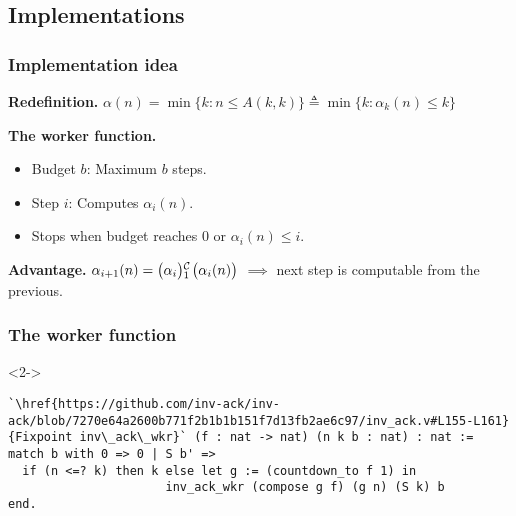 \subsection{Implementations}
\begin{frame}
\frametitle{Implementation idea}
\textbf{Redefinition.}
$
\alpha(n) = \min\{k: n\le A(k, k) \} \triangleq \min\{k: \alpha_k(n)\le k \}
$

\bigskip

\textbf{The worker function.}
\bigskip
\begin{itemize}
	\item Budget $b$: Maximum $b$ steps.
	\item Step $i$: Computes $\alpha_i(n)$.
	\item Stops when budget reaches $0$ or $\alpha_i(n) \le i$.
\end{itemize}

\bigskip

\textbf{Advantage.} $\alpha_{i+1}(n) = \cdt{\big(\alpha_i\big)}{1}\big(\alpha_i(n)\big)$ $\implies$ next step is computable from the previous.
\end{frame}


\begin{frame}[fragile]
\frametitle{The worker function}


\bigskip

\begin{overlayarea}{\linewidth}{3cm}
\begin{onlyenv}<2->
	\begin{lstlisting}
`\href{https://github.com/inv-ack/inv-ack/blob/7270e64a2600b771f2b1b1b151f7d13fb2ae6c97/inv_ack.v#L155-L161} {Fixpoint inv\_ack\_wkr}` (f : nat -> nat) (n k b : nat) : nat :=
match b with 0 => 0 | S b' =>
  if (n <=? k) then k else let g := (countdown_to f 1) in
                      inv_ack_wkr (compose g f) (g n) (S k) b
end.
\end{lstlisting}
\end{onlyenv}
\end{overlayarea}

\end{frame}



